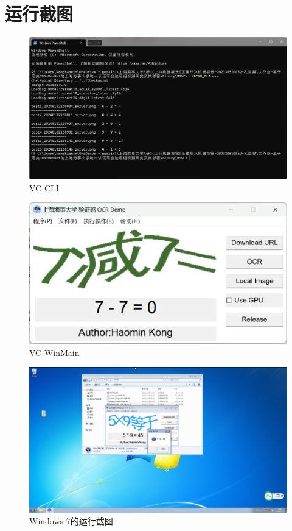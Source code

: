 \section{运行截图}

\begin{figure}
	\centering
	\includegraphics[width=0.9\linewidth]{Resources/Picture/Deploy/Windows/MSVC/vc_cli}
	\caption{VC CLI}
	\label{fig:vccli}
\end{figure}

\begin{figure}
	\centering
	\includegraphics[width=0.9\linewidth]{Resources/Picture/Deploy/Windows/MSVC/vc_main}
	\caption{VC WinMain}
	\label{fig:vcmain}
\end{figure}

\begin{figure}
	\centering
	\includegraphics[width=0.9\linewidth]{Resources/Picture/Deploy/Windows/MSVC/msvc-win7}
	\caption{Windows 7的运行截图}
	\label{fig:msvc-win7}
\end{figure}
